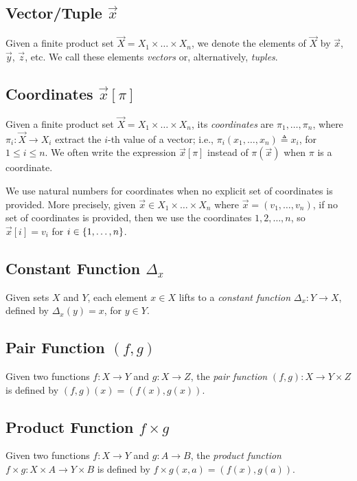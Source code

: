 \subsection{Vector/Tuple $\vec{x}$}
Given a finite product set $\vec{X}=X_1\times \ldots \times X_n$, we denote the elements of $\vec{X}$ by $\vec{x}$, $\vec{y}$, $\vec{z}$, etc. We call these elements \emph{vectors} or, alternatively, \emph{tuples}. 

\subsection{Coordinates $\vec{x}[\pi]$}
Given a finite product set $\vec{X}=X_1\times \ldots \times X_n$, its \emph{coordinates} are $\pi_1, \ldots, \pi_n$, where $\pi_i\colon \vec{X} \rightarrow X_i$ extract the $i$-th value of a vector; i.e., $\pi_i(x_1, \ldots, x_n)\triangleq x_i$, for $1\leq i \leq n$. We often write the expression $\vec{x}[\pi]$ instead of $\pi(\vec{x})$ when $\pi$ is a coordinate. %

We use natural numbers for coordinates when no explicit set of coordinates is provided. More precisely, given $\vec{x}\in X_1\times \ldots \times X_n$ where $\vec{x}=(v_1, \ldots, v_n)$, if no set of coordinates is provided, then we use the coordinates $1, 2, \ldots , n$, so $\vec{x}[i]=v_i$ for $i\in \left\{1, \ldots, n\right\}$. 

\subsection{Constant Function $\Delta_x$}
Given sets $X$ and $Y$, each element $x\in X$ lifts to a \emph{constant function} $\Delta_x\colon Y\rightarrow X$, defined by $\Delta_x(y)=x$, for $y\in Y$.

\subsection{Pair Function $(f,g)$}
Given two functions $f\colon X\rightarrow Y$ and $g\colon X\rightarrow Z$, the \emph{pair function} $(f,g)\colon X\rightarrow Y\times Z$ is defined by $(f,g)(x)=(f(x),g(x))$.

\subsection{Product Function $f\times g$}
Given two functions $f\colon X\rightarrow Y$ and $g\colon A\rightarrow B$, the \emph{product function} $f\times g\colon X\times A\rightarrow Y\times B$ is defined by $f\times g(x,a)=(f(x),g(a))$.

